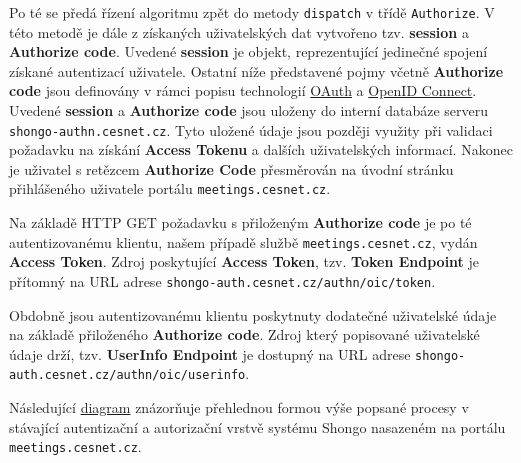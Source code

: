 \documentclass[
  printed, %
  twoside, %
  table,   %
  nolof,     %
  nolot,     %
]{fithesis3}
\begin{document}
Po té se předá řízení algoritmu zpět do metody \texttt{dispatch} v třídě \texttt{Authorize}. V této metodě je dále z získaných uživatelských dat vytvořeno tzv. \textbf{session} a \textbf{Authorize code}. Uvedené \textbf{session} je objekt, reprezentující jedinečné spojení získané autentizací uživatele. Ostatní níže představené pojmy včetně \textbf{Authorize code} jsou definovány v rámci popisu technologií \hyperref[sec:oauth]{OAuth} a \hyperref[sec:oidc]{OpenID Connect}. Uvedené \textbf{session} a \textbf{Authorize code} jsou uloženy do interní databáze serveru \texttt{shongo-authn.cesnet.cz}. Tyto uložené údaje jsou později využity při validaci požadavku na získání \textbf{Access Tokenu} a dalších uživatelských informací. Nakonec je uživatel s retězcem \textbf{Authorize Code} přesměrován na úvodní stránku přihlášeného uživatele portálu \texttt{meetings.cesnet.cz}. \par

Na základě HTTP GET požadavku s přiloženým \textbf{Authorize code} je po té autentizovanému klientu, našem případě službě \texttt{meetings.cesnet.cz}, vydán  \textbf{Access Token}. Zdroj poskytující \textbf{Access Token}, tzv. \textbf{Token Endpoint} je přítomný na URL adrese \texttt{shongo-auth.cesnet.cz/authn/oic/token}. \par 

Obdobně jsou autentizovanému klientu poskytnuty dodatečné uživatelské údaje na základě přiloženého \textbf{Authorize code}. Zdroj který popisované uživatelské údaje drží, tzv. \textbf{UserInfo Endpoint} je dostupný na URL adrese \texttt{shongo-auth.cesnet.cz/authn/oic/userinfo}.  \par 

Následující \hyperref[fig:shongoAuthnProcess]{diagram} znázorňuje přehlednou formou výše popsané procesy v stávající autentizační a autorizační vrstvě systému Shongo nasazeném na portálu \texttt{meetings.cesnet.cz}. 
\end{document}
